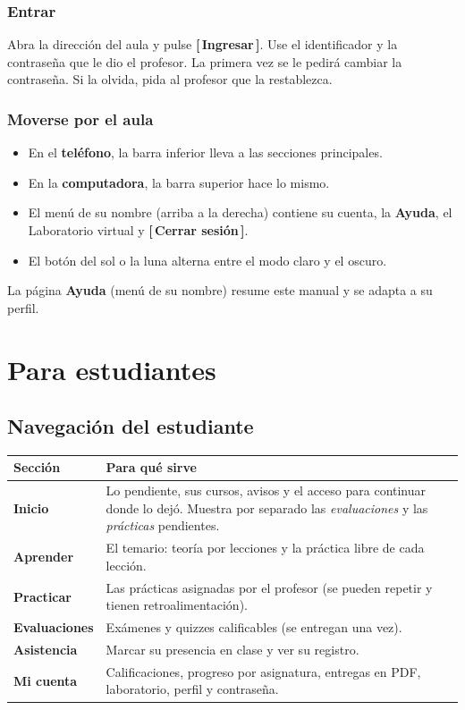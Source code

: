 \documentclass[11pt,a4paper,oneside]{book}
\newcommand{\boton}[1]{\textsf{\textbf{[\,#1\,]}}}
\newcommand{\menu}[1]{\textsf{\textbf{#1}}}
\begin{document}
\section{Entrar}
Abra la dirección del aula y pulse \boton{Ingresar}. Use el identificador y la contraseña que le dio el profesor.
La primera vez se le pedirá cambiar la contraseña. Si la olvida, pida al profesor que la restablezca.

\section{Moverse por el aula}
\begin{itemize}
  \item En el \textbf{teléfono}, la barra inferior lleva a las secciones principales.
  \item En la \textbf{computadora}, la barra superior hace lo mismo.
  \item El menú de su nombre (arriba a la derecha) contiene su cuenta, la \menu{Ayuda}, el Laboratorio virtual y
        \boton{Cerrar sesión}.
  \item El botón del sol o la luna alterna entre el modo claro y el oscuro.
\end{itemize}

\begin{consejo}
La página \menu{Ayuda} (menú de su nombre) resume este manual y se adapta a su perfil.
\end{consejo}

\part{Para estudiantes}

\chapter{Navegación del estudiante}

\begin{center}
\begin{tabularx}{\linewidth}{>{\bfseries}l X}
\toprule
Sección & Para qué sirve \\
\midrule
Inicio & Lo pendiente, sus cursos, avisos y el acceso para continuar donde lo dejó. Muestra por separado las
         \emph{evaluaciones} y las \emph{prácticas} pendientes. \\
Aprender & El temario: teoría por lecciones y la práctica libre de cada lección. \\
Practicar & Las prácticas asignadas por el profesor (se pueden repetir y tienen retroalimentación). \\
Evaluaciones & Exámenes y quizzes calificables (se entregan una vez). \\
Asistencia & Marcar su presencia en clase y ver su registro. \\
Mi cuenta & Calificaciones, progreso por asignatura, entregas en PDF, laboratorio, perfil y contraseña. \\
\bottomrule
\end{tabularx}
\end{center}
\end{document}
